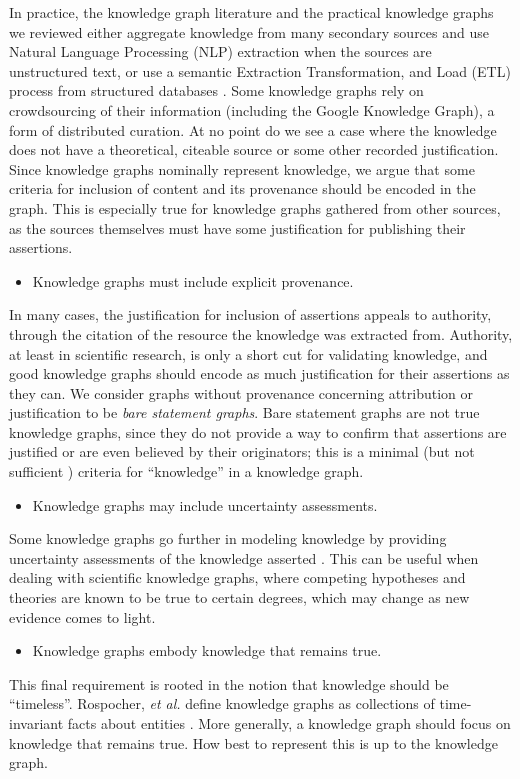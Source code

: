 In practice, the knowledge graph literature and the practical knowledge graphs we reviewed either aggregate knowledge from many secondary sources and use Natural Language Processing (NLP) extraction when the sources are unstructured text, or use a semantic Extraction Transformation, and Load (ETL) process from structured databases \cite{McCusker_2009}.
Some knowledge graphs rely on crowdsourcing of their information (including the Google Knowledge Graph), a form of distributed curation.
At no point do we see a case where the knowledge does not have a theoretical, citeable source or some other recorded justification.
Since knowledge graphs nominally represent knowledge, we argue that some criteria for inclusion of content and its provenance should be encoded in the graph.
This is especially true for knowledge graphs gathered from other sources, as the sources themselves must have some justification for publishing their assertions.
\begin {itemize}
\item Knowledge graphs must include explicit provenance.
\end {itemize}
In many cases, the justification for inclusion of assertions appeals to authority, through the citation of the resource the knowledge was extracted from.
Authority, at least in scientific research, is only a short cut for validating knowledge, and good knowledge graphs should encode as much justification for their assertions as they can.
We consider graphs without provenance concerning attribution or justification to be {\em bare statement graphs}. Bare statement graphs are not true knowledge graphs, since they do not provide a way to confirm that assertions are justified or are even believed by their originators; this is a minimal (but not sufficient \cite{Gettier_1963}) criteria for ``knowledge'' in a knowledge graph.

\begin {itemize}
\item Knowledge graphs may include uncertainty assessments.
\end {itemize}

Some knowledge graphs go further in modeling knowledge by providing uncertainty assessments of the knowledge asserted \cite{Dong_2014}.
This can be useful when dealing with scientific knowledge graphs, where competing hypotheses and theories are known to be true to certain degrees, which may change as new evidence comes to light.
\begin {itemize}
\item Knowledge graphs embody knowledge that remains true.
\end {itemize}

This final requirement is rooted in the notion that knowledge should be ``timeless''.
Rospocher, \textit{et al.} define knowledge graphs as collections of time-invariant facts about entities \cite{Rospocher2016}.
More generally, a knowledge graph should focus on knowledge that remains true.
How best to represent this is up to the knowledge graph.